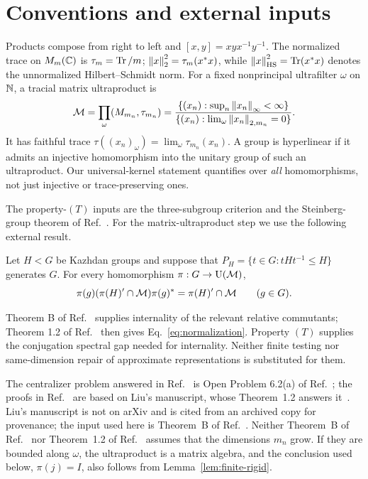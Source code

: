 \section{Conventions and external inputs}\label{sec:inputs}

Products compose from right to left and $[x,y]=xyx^{-1}y^{-1}$. The normalized trace on
$M_m(\mathbb C)$ is $\tau_m=\operatorname{Tr}/m$; $\left\lVert x\right\rVert_2^2=\tau_m(x^*x)$, while
$\left\lVert x\right\rVert_{\mathrm{HS}}^2=\operatorname{Tr}(x^*x)$ denotes the unnormalized Hilbert--Schmidt norm.
For a fixed nonprincipal ultrafilter $\omega$ on $\mathbb N$, a tracial matrix ultraproduct is
\begin{equation}
 \mathcal M=\prod_\omega(M_{m_n},\tau_{m_n})
 =\frac{\{(x_n):\sup_n\left\lVert x_n\right\rVert_\infty<\infty\}}
 {\{(x_n):\lim_\omega\left\lVert x_n\right\rVert_{2,m_n}=0\}}.
 \label{eq:ultra}
\end{equation}
It has faithful trace $\tau((x_n)_\omega)=\lim_\omega\tau_{m_n}(x_n)$.
A group is hyperlinear if it admits an injective homomorphism into the unitary group of
such an ultraproduct. Our universal-kernel statement quantifies over \emph{all}
homomorphisms, not just injective or trace-preserving ones.

The property-$(T)$ inputs are the three-subgroup criterion and the Steinberg-group theorem
of Ref.~\cite{ejz}. For the matrix-ultraproduct step we use the following external result.

\begin{theorem}\label{thm:external}
Let $H<G$ be Kazhdan groups and suppose that
$P_H=\{t\in G:tHt^{-1}\le H\}$ generates $G$. For every homomorphism
$\pi:G\to\operatorname{U}(\mathcal M)$,
\begin{equation}
 \pi(g)(\pi(H)'\cap\mathcal M)\pi(g)^*=\pi(H)'\cap\mathcal M
 \qquad(g\in G).
 \label{eq:normalization}
\end{equation}
\end{theorem}

Theorem B of Ref.~\cite{alt} supplies internality of the relevant relative commutants;
Theorem 1.2 of Ref.~\cite{thom} then gives Eq.~\eqref{eq:normalization}. Property $(T)$
supplies the conjugation spectral gap needed for internality. Neither finite testing nor
same-dimension repair of approximate representations is substituted for them.

The centralizer problem answered in Ref.~\cite{alt} is Open Problem 6.2(a) of Ref.~\cite{at};
the proofs in Ref.~\cite{alt} are based on Liu's manuscript, whose Theorem~1.2 answers it~\cite{liu}.
Liu's manuscript is not on arXiv and is cited from an archived copy for provenance; the input
used here is Theorem~B of Ref.~\cite{alt}. Neither Theorem~B of Ref.~\cite{alt} nor
Theorem~1.2 of Ref.~\cite{thom} assumes that the dimensions $m_n$ grow. If they are bounded along $\omega$, the
ultraproduct is a matrix algebra, and the conclusion used below, $\pi(j)=I$, also follows
from Lemma~\ref{lem:finite-rigid}.

